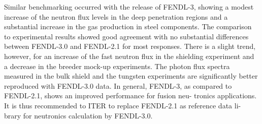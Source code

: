 Similar benchmarking occurred with the release of \gls{FENDL}-3, showing a
modest increase of the neutron flux levels in the deep penetration regions and
a substantial increase in the gas production in steel components.  The
comparison to experimental results showed good agreement with no substantial
differences between FENDL-3.0 and FENDL-2.1 for most responses.  There is a
slight trend, however, for an increase of the fast neutron flux in the
shielding experiment and a decrease in the breeder mock-up experiments. The
photon flux spectra measured in the bulk shield and the tungsten experiments
are significantly better reproduced with FENDL-3.0 data. In general, FENDL-3,
as compared to FENDL-2.1, shows an improved performance for fusion neu-
tronics applications. It is thus recommended to ITER to replace FENDL-2.1 as
reference data li- brary for neutronics calculation by FENDL-3.0.


